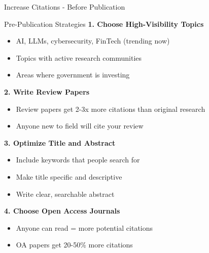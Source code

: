 \documentclass[11pt]{beamer}
\begin{document}
	\begin{frame}{Increase Citations - Before Publication}
		\scriptsize
		\begin{block}{Pre-Publication Strategies}
			\textbf{1. Choose High-Visibility Topics}
			\begin{itemize}
				\item AI, LLMs, cybersecurity, FinTech (trending now)
				\item Topics with active research communities
				\item Areas where government is investing
			\end{itemize}
			\textbf{2. Write Review Papers}
			\begin{itemize}
				\item Review papers get 2-3x more citations than original research
				\item Anyone new to field will cite your review
			\end{itemize}
			\textbf{3. Optimize Title and Abstract}
			\begin{itemize}
				\item Include keywords that people search for
				\item Make title specific and descriptive
				\item Write clear, searchable abstract
			\end{itemize}
			\textbf{4. Choose Open Access Journals}
			\begin{itemize}
				\item Anyone can read = more potential citations
				\item OA papers get 20-50\% more citations
			\end{itemize}
		\end{block}
	\end{frame}
	
\end{document}
